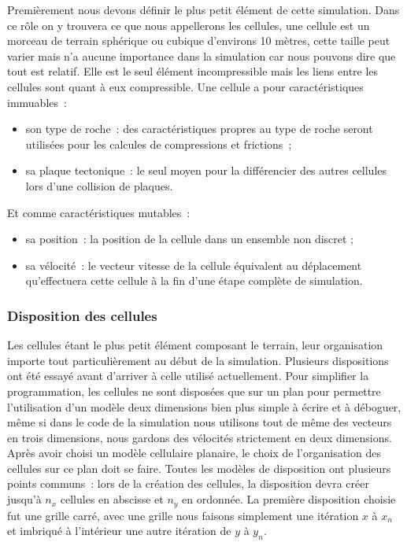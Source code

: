 \documentclass[a4paper,11pt]{article}
\begin{document}
Premièrement nous devons définir le plus petit élément de cette simulation.
Dans ce rôle on y trouvera ce que nous appellerons les cellules, une cellule est un morceau de terrain sphérique ou cubique d'environs 10 mètres, cette taille peut varier mais n'a aucune importance dans la simulation car nous pouvons dire que tout est relatif.
Elle est le seul élément incompressible mais les liens entre les cellules sont quant à eux compressible.
Une cellule a pour caractéristiques immuables~:
\begin{itemize}
  \item son type de roche~: des caractéristiques propres au type de roche seront utilisées pour les calcules de compressions et frictions~;
  \item sa plaque tectonique~: le seul moyen pour la différencier des autres cellules lors d'une collision de plaques.
\end{itemize}
Et comme caractéristiques mutables~:
\begin{itemize}
  \item sa position~: la position de la cellule dans un ensemble non discret ;
  \item sa vélocité~: le vecteur vitesse de la cellule équivalent au déplacement qu'effectuera cette cellule à la fin d'une étape complète de simulation.
\end{itemize}

\subsubsection{Disposition des cellules}

Les cellules étant le plus petit élément composant le terrain, leur organisation importe tout particulièrement au début de la simulation.
Plusieurs dispositions ont été essayé avant d'arriver à celle utilisé actuellement.
Pour simplifier la programmation, les cellules ne sont disposées que sur un plan pour permettre l'utilisation d'un modèle deux dimensions bien plus simple à écrire et à déboguer, même si dans le code de la simulation nous utilisons tout de même des vecteurs en trois dimensions, nous gardons des vélocités strictement en deux dimensions. \\
Après avoir choisi un modèle cellulaire planaire, le choix de l'organisation des cellules sur ce plan doit se faire.
Toutes les modèles de disposition ont plusieurs points communs~: lors de la création des cellules, la disposition devra créer jusqu'à $n_x$ cellules en abscisse et $n_y$ en ordonnée.
La première disposition choisie fut une grille carré, avec une grille nous faisons simplement une itération $x$ à $x_n$ et imbriqué à l'intérieur une autre itération de $y$ à $y_n$.
\end{document}
